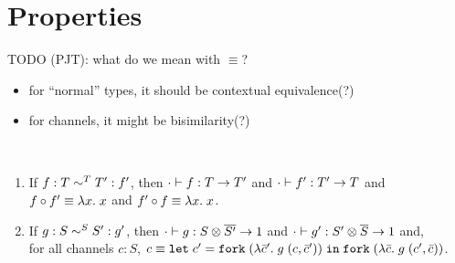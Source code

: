 
\section{Properties}
\label{sec:properties}

TODO (PJT): what do we mean with $\equiv$?
\begin{itemize}
\item for ``normal'' types, it should be contextual equivalence(?)
\item for channels, it might be bisimilarity(?)
\end{itemize}

\begin{lemma}[Conversions]~\\[-\baselineskip]
  \begin{enumerate}
  \item If $f : T \eqt T' : f'$,
  then $\typingE[\CNil]{f}{\TFun T{T'}}$
  and  $\typingE[\CNil]{f'}{\TFun {T'}T}$
  and  $f \circ f' \equiv \ELam x x$
  and  $f' \circ f \equiv \ELam x x$.
\item If $g : S \eqs S' : g'$,
  then $\typingE[\CNil]{g}{\TFun {\TPair {S} {\TDual{S'}}} \TUnit}$
  and $\typingE[\CNil]{g'}{\TFun {\TPair {S'} {\TDual{S}}} \TUnit}$
  and,\\
  for all channels $c : S$,  $c \equiv \ELet{c'}{\EFork{( \ELam {\bar c'} g \; (c, \bar c')) }}{\EFork{( \ELam {\bar c} g \; (c', \bar c)) }} $. 
\end{enumerate}
\end{lemma}


